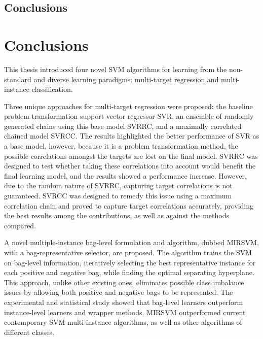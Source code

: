 \documentclass[reqno]{vcuthesis}
\numberwithin{equation}{chapter}
\begin{document}
\begin{table}[t!]
\begin{minipage}{0.3\textwidth}
{}
\captionsetup{width=0.8\linewidth}
\label{fig:BonfDunnsv}
\end{minipage}
\end{table}

\section{Conclusions}

\chapter{Conclusions}
This thesis introduced four novel SVM algorithms for learning from the non-standard and diverse learning paradigms: multi-target regression and multi-instance classification. 

Three unique approaches for multi-target regression were proposed: the baseline problem transformation support vector regressor SVR, an ensemble of randomly generated chains using this base model SVRRC, and a maximally correlated chained model SVRCC. The results highlighted the better performance of SVR as a base model, however, because it is a problem transformation method, the possible correlations amongst the targets are lost on the final model. SVRRC was designed to test whether taking these correlations into account would benefit the final learning model, and the results showed a performance increase. However, due to the random nature of SVRRC, capturing target correlations is not guaranteed. SVRCC was designed to remedy this issue using a maximum correlation chain and proved to capture target correlations accurately, providing the best results among the contributions, as well as against the methods compared. 

A novel multiple-instance bag-level formulation and algorithm, dubbed MIRSVM, with a bag-representative selector, are proposed. The algorithm trains the SVM on bag-level information, iteratively selecting the best representative instance for each positive and negative bag, while finding the optimal separating hyperplane. This approach, unlike other existing ones, eliminates possible class imbalance issues by allowing both positive and negative bags to be represented. The experimental and statistical study showed that bag-level learners outperform instance-level learners and wrapper methods. MIRSVM outperformed current contemporary SVM multi-instance algorithms, as well as other algorithms of different classes. 
\end{document}
